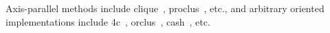 \begin{itemize}
    
    Axis-parallel methods include \acrshort{clique}~\cite{cliqueagrawal1998automatic}, \acrshort{proclus}~\cite{proclusaggarwal1999fast}, etc., and arbitrary oriented implementations include \acrshort{4c}~\cite{4cbohm2004computing}, \acrshort{orclus}~\cite{orclusaggarwal2000finding}, \acrshort{cash}~\cite{CASHachtert2008global}, etc.
\end{itemize}

